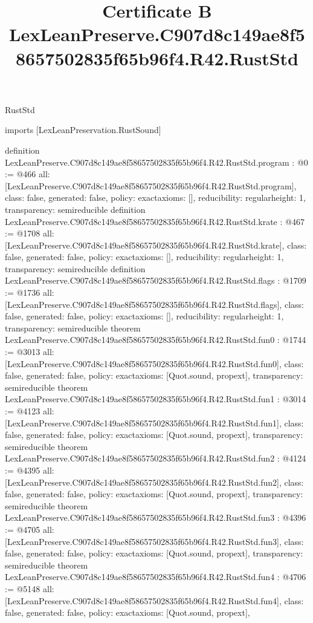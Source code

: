 \begin{lexlean}{RustStd}
\title{Certificate B LexLeanPreserve.C907d8c149ae8f58657502835f65b96f4.R42.RustStd}
\begin{coremodule}
imports [LexLeanPreservation.RustSound]

definition LexLeanPreserve.C907d8c149ae8f58657502835f65b96f4.R42.RustStd.program : @0 := @466 {
  all: [LexLeanPreserve.C907d8c149ae8f58657502835f65b96f4.R42.RustStd.program],
  class: false,
  generated: false,
  policy: exact{axioms: []},
  reducibility: regular{height: 1},
  transparency: semireducible
}
definition LexLeanPreserve.C907d8c149ae8f58657502835f65b96f4.R42.RustStd.krate : @467 := @1708 {
  all: [LexLeanPreserve.C907d8c149ae8f58657502835f65b96f4.R42.RustStd.krate],
  class: false,
  generated: false,
  policy: exact{axioms: []},
  reducibility: regular{height: 1},
  transparency: semireducible
}
definition LexLeanPreserve.C907d8c149ae8f58657502835f65b96f4.R42.RustStd.flags : @1709 := @1736 {
  all: [LexLeanPreserve.C907d8c149ae8f58657502835f65b96f4.R42.RustStd.flags],
  class: false,
  generated: false,
  policy: exact{axioms: []},
  reducibility: regular{height: 1},
  transparency: semireducible
}
theorem LexLeanPreserve.C907d8c149ae8f58657502835f65b96f4.R42.RustStd.fun0 : @1744 := @3013 {
  all: [LexLeanPreserve.C907d8c149ae8f58657502835f65b96f4.R42.RustStd.fun0],
  class: false,
  generated: false,
  policy: exact{axioms: [Quot.sound, propext]},
  transparency: semireducible
}
theorem LexLeanPreserve.C907d8c149ae8f58657502835f65b96f4.R42.RustStd.fun1 : @3014 := @4123 {
  all: [LexLeanPreserve.C907d8c149ae8f58657502835f65b96f4.R42.RustStd.fun1],
  class: false,
  generated: false,
  policy: exact{axioms: [Quot.sound, propext]},
  transparency: semireducible
}
theorem LexLeanPreserve.C907d8c149ae8f58657502835f65b96f4.R42.RustStd.fun2 : @4124 := @4395 {
  all: [LexLeanPreserve.C907d8c149ae8f58657502835f65b96f4.R42.RustStd.fun2],
  class: false,
  generated: false,
  policy: exact{axioms: [Quot.sound, propext]},
  transparency: semireducible
}
theorem LexLeanPreserve.C907d8c149ae8f58657502835f65b96f4.R42.RustStd.fun3 : @4396 := @4705 {
  all: [LexLeanPreserve.C907d8c149ae8f58657502835f65b96f4.R42.RustStd.fun3],
  class: false,
  generated: false,
  policy: exact{axioms: [Quot.sound, propext]},
  transparency: semireducible
}
theorem LexLeanPreserve.C907d8c149ae8f58657502835f65b96f4.R42.RustStd.fun4 : @4706 := @5148 {
  all: [LexLeanPreserve.C907d8c149ae8f58657502835f65b96f4.R42.RustStd.fun4],
  class: false,
  generated: false,
  policy: exact{axioms: [Quot.sound, propext]},
}
\end{coremodule}
\end{lexlean}
